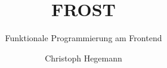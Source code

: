 \titlehead{}
\subject{AI--Projekt}
\title{FROST}
\subtitle{Funktionale Programmierung am Frontend}
\author{Christoph Hegemann}
\publishers{Betreut von Prof.\ Dr.\ Christian Kohls}

